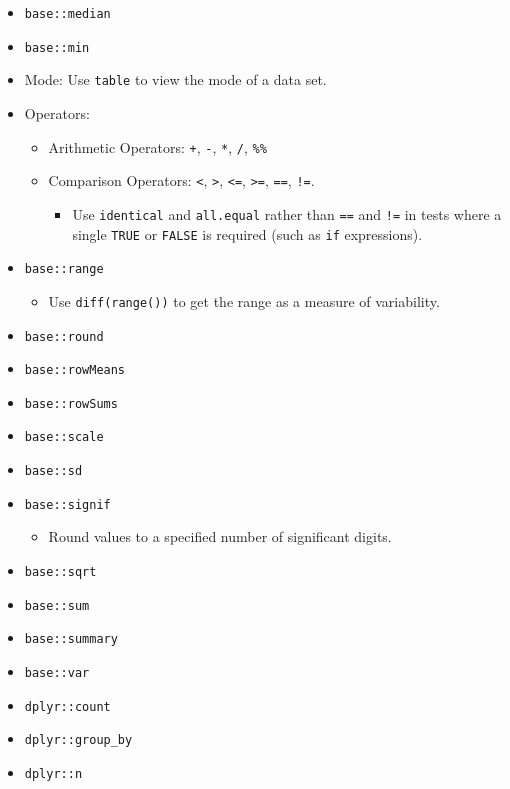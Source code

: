 \documentclass[
]{book}
\providecommand{\tightlist}{%
  \setlength{\itemsep}{0pt}\setlength{\parskip}{0pt}}
\begin{document}
\begin{itemize}
\tightlist
\item
  \texttt{base::median}
\item
  \texttt{base::min}
\item
  Mode: Use \texttt{table} to view the mode of a data set.
\item
  Operators:

  \begin{itemize}
  \tightlist
  \item
    Arithmetic Operators: \texttt{+}, \texttt{-}, \texttt{*}, \texttt{/}, \texttt{\%\%}
  \item
    Comparison Operators: \texttt{\textless{}}, \texttt{\textgreater{}}, \texttt{\textless{}=}, \texttt{\textgreater{}=}, \texttt{==}, \texttt{!=}.

    \begin{itemize}
    \tightlist
    \item
      Use \texttt{identical} and \texttt{all.equal} rather than \texttt{==} and \texttt{!=} in tests where a single \texttt{TRUE} or \texttt{FALSE} is required (such as \texttt{if} expressions).
    \end{itemize}
  \end{itemize}
\item
  \texttt{base::range}

  \begin{itemize}
  \tightlist
  \item
    Use \texttt{diff(range())} to get the range as a measure of variability.
  \end{itemize}
\item
  \texttt{base::round}
\item
  \texttt{base::rowMeans}
\item
  \texttt{base::rowSums}
\item
  \texttt{base::scale}
\item
  \texttt{base::sd}
\item
  \texttt{base::signif}

  \begin{itemize}
  \tightlist
  \item
    Round values to a specified number of significant digits.
  \end{itemize}
\item
  \texttt{base::sqrt}
\item
  \texttt{base::sum}
\item
  \texttt{base::summary}
\item
  \texttt{base::var}
\item
  \texttt{dplyr::count}
\item
  \texttt{dplyr::group\_by}
\item
  \texttt{dplyr::n}


\end{itemize}
\end{document}
